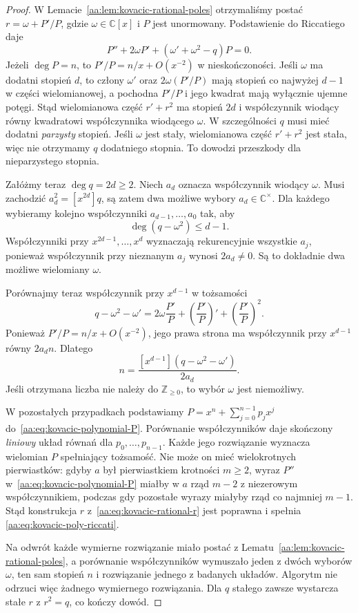\begin{proof}
W Lemacie~\ref{aa:lem:kovacic-rational-poles}
otrzymaliśmy postać
$r=\omega+P'/P$, gdzie
$\omega\in\mathbb C[x]$
i $P$ jest unormowany.
Podstawienie do Riccatiego daje
\begin{equation}\label{aa:eq:kovacic-polynomial-P}
 P''+2\omega P'
 +(\omega'+\omega^2-q)P=0.
\end{equation}
Jeżeli $\deg P=n$, to
$P'/P=n/x+O(x^{-2})$
w nieskończoności.
Jeśli $\omega$ ma dodatni
stopień $d$, to człony
$\omega'$ oraz
$2\omega(P'/P)$
mają stopień co najwyżej
$d-1$ w części wielomianowej,
a pochodna $P'/P$ i jego
kwadrat mają wyłącznie
ujemne potęgi.
Stąd wielomianowa część
$r'+r^2$ ma stopień $2d$
i współczynnik wiodący
równy kwadratowi
współczynnika wiodącego
$\omega$. W szczególności
$q$ musi mieć dodatni
\emph{parzysty} stopień.
Jeśli $\omega$ jest stały,
wielomianowa część
$r'+r^2$ jest stała,
więc nie otrzymamy
$q$ dodatniego stopnia.
To dowodzi przeszkody
dla nieparzystego stopnia.

Załóżmy teraz $\deg q=2d\ge2$.
Niech $a_d$ oznacza
współczynnik wiodący
$\omega$. Musi zachodzić
$a_d^2=[x^{2d}]q$, są
zatem dwa możliwe wybory
$a_d\in\mathbb C^\times$.
Dla każdego wybieramy
kolejno współczynniki
$a_{d-1},\ldots,a_0$
tak, aby
\[
 \deg(q-\omega^2)\le d-1.
\]
Współczynniki przy
$x^{2d-1},\ldots,x^d$
wyznaczają rekurencyjnie
wszystkie $a_j$,
ponieważ współczynnik
przy nieznanym $a_j$
wynosi $2a_d\ne0$.
Są to dokładnie
dwa możliwe wielomiany
$\omega$.

Porównajmy teraz
współczynnik przy
$x^{d-1}$ w tożsamości
\[
 q-\omega^2-\omega'
 =2\omega\frac{P'}P+
 \left(\frac{P'}P\right)'
 +\left(\frac{P'}P\right)^2.
\]
Ponieważ $P'/P=n/x+O(x^{-2})$,
jego prawa strona ma
współczynnik przy $x^{d-1}$
równy $2a_dn$. Dlatego
\begin{equation}\label{aa:eq:kovacic-degree-n}
 n=\frac{[x^{d-1}](q-\omega^2-\omega')}
          {2a_d}.
\end{equation}
Jeśli otrzymana liczba
nie należy do $\mathbb Z_{\ge0}$,
to wybór $\omega$ jest
niemożliwy.

W pozostałych przypadkach
podstawiamy
$P=x^n+\sum_{j=0}^{n-1}p_jx^j$
do~\eqref{aa:eq:kovacic-polynomial-P}.
Porównanie współczynników
daje skończony
\emph{liniowy} układ równań
dla $p_0,\ldots,p_{n-1}$.
Każde jego rozwiązanie
wyznacza wielomian $P$
spełniający tożsamość.
Nie może on mieć
wielokrotnych pierwiastków:
gdyby $a$ był pierwiastkiem
krotności $m\ge2$, wyraz
$P''$ w~\eqref{aa:eq:kovacic-polynomial-P}
miałby w $a$ rząd
$m-2$ z niezerowym współczynnikiem,
podczas gdy pozostałe
wyrazy miałyby rząd
co najmniej $m-1$.
Stąd konstrukcja $r$
z~\eqref{aa:eq:kovacic-rational-r}
jest poprawna i spełnia
\eqref{aa:eq:kovacic-poly-riccati}.

Na odwrót każde wymierne
rozwiązanie miało postać
z Lematu~\ref{aa:lem:kovacic-rational-poles},
a porównanie współczynników
wymuszało jeden z dwóch
wyborów $\omega$, ten sam
stopień $n$ i rozwiązanie
jednego z badanych układów.
Algorytm nie odrzuci więc
żadnego wymiernego rozwiązania.
Dla $q$ stałego zawsze
wystarcza stałe $r$
z $r^2=q$, co kończy dowód.
\end{proof}

